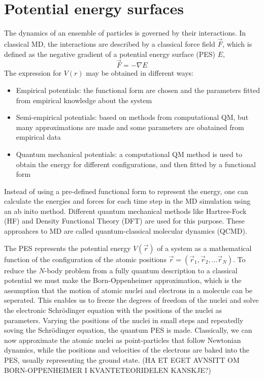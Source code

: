 \documentclass[twoside,english]{uiofysmaster}
\begin{document}
\section{Potential energy surfaces} \label{sec:potentialEnergySurfaces}
The dynamics of an ensemble of particles is governed by their interactions. 
In classical MD, the interactions are described
by a classical force field $\vec{F}$, which is defined as the negative gradient of a potential energy surface (PES) $E$,
\begin{equation}
 \vec{F} = -\nabla E
 \label{forcePES}
\end{equation}
The expression for $V(r)$ may be obtained in different ways:
\begin{itemize}
 \item Empirical potentials: the functional form are chosen and the parameters fitted from 
 empirical knowledge about the system
 \item Semi-empirical potentials: based on methods from computational QM, but many approximations
 are made and some parameters are obatained from empirical data
 \item Quantum mechanical potentials: a computational QM method 
 is used to obtain the energy for different configurations, and then fitted by a functional form
\end{itemize}
Instead of using a pre-defined functional form to represent the energy, one can 
calculate the energies and forces for each time step in the MD simulation using an ab inito method. 
Different quantum mechanical methods like Hartree-Fock (HF) and Density Functional Theory (DFT) are used for this purpose. 
These approahces to MD are called quantum-classical molecular dynamics (QCMD). 

The PES represents the potential energy $V(\vec{r})$ of a system as a mathematical function of the configuration of the atomic 
positions $\vec{r} = (\vec{r}_1, \vec{r}_2, \dots \vec{r}_N)$. To reduce
the $N$-body problem from a fully quantum description to a classical potential we must make the Born-Oppenheimer 
approximation, which is the assumption that the motion of atomic nuclei and electrons in a molecule
can be seperated. This enables us to freeze the degrees of freedom of the nuclei and solve the electronic
Schrödinger equation with the positions of the nuclei as parameters. Varying the positions of the nuclei
in small steps and repeatedly soving the Schrödinger equation, the quantum PES is made. 
Classically, we can now approximate the atomic nuclei as point-particles that follow
Newtonian dynamics, while the positions and velocities of the electrons are baked into the PES, usually
representing the ground state. (HA ET EGET AVNSITT OM BORN-OPPENHEIMER I KVANTETEORIDELEN KANSKJE?)
\end{document}
